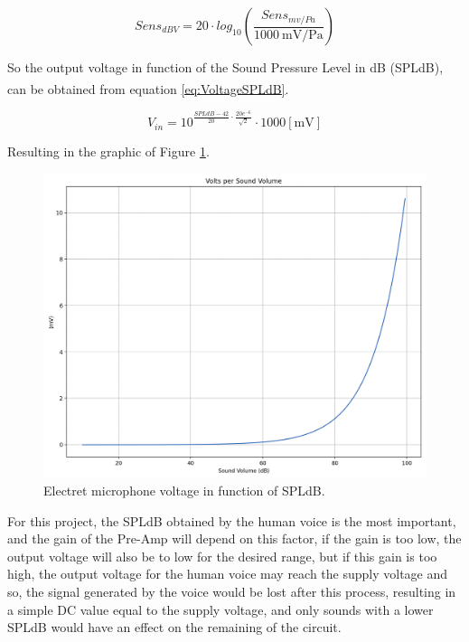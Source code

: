 \begin{equation}
    Sens_{dBV} = 20 \cdot log_{10} (\frac{Sens_{mv/Pa}}{\SI{1000}{\milli\volt}/\si{\pascal}})
    \label{eq:SensdBV}
\end{equation}

So the output voltage in function of the Sound Pressure Level in dB (SPLdB), can be obtained from equation \ref{eq:VoltageSPLdB}\textsuperscript{\cite{micro-datasheet}}.

\begin{equation}
    V_{in} = 10^{\frac{SPLdB-42}{20} \cdot \frac{20e^{-6}}{\sqrt{2}} } \cdot 1000 [\si{\milli\volt}]
    \label{eq:VoltageSPLdB}
\end{equation}

Resulting in the graphic of Figure \ref{fig:GraphSPLdB}.

\begin{figure}[H]
    \centering
    \includegraphics*[scale = 0.3]{Images/GraphSPLdB.png}
    \caption{Electret microphone voltage in function of SPLdB.}
    \label{fig:GraphSPLdB}
\end{figure}

For this project, the SPLdB obtained by the human voice is the most important, and the gain of the Pre-Amp will depend on this factor, if the gain is too low, the output voltage will also be to low for the desired range, but if this gain is too high, the output voltage for the human voice may reach the supply voltage and so, the signal generated by the voice would be lost after this process, resulting in a simple DC value equal to the supply voltage, and only sounds with a lower SPLdB would have an effect on the remaining of the circuit.

